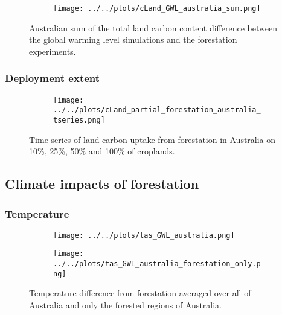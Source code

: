 \documentclass[]{article}
\begin{document}
\begin{figure}[H]
    \centering
    \begin{subfigure}[b]{\linewidth}
        \texttt{[image: ../../plots/cLand\_GWL\_australia\_sum.png]}
    \end{subfigure}
    \caption{Australian sum of the total land carbon content difference between the global warming level simulations and the forestation experiments.}
    \label{fig:australia_cLand}
\end{figure}

\subsubsection{Deployment extent}

\begin{figure}[H]
    \centering
    \begin{subfigure}[b]{\linewidth}
        \texttt{[image: ../../plots/cLand\_partial\_forestation\_australia\_tseries.png]}
    \end{subfigure}
    \caption{Time series of land carbon uptake from forestation in Australia on 10\%, 25\%, 50\% and 100\% of croplands.}
    \label{fig:australia_cLand_tseries}
\end{figure}

\subsection{Climate impacts of forestation}

\subsubsection{Temperature}

\begin{figure}[H]
    \centering
    \begin{subfigure}[b]{0.4\linewidth}
        \texttt{[image: ../../plots/tas\_GWL\_australia.png]}
    \end{subfigure}
    \begin{subfigure}[b]{0.4\linewidth}
        \texttt{[image: ../../plots/tas\_GWL\_australia\_forestation\_only.png]}
    \end{subfigure}
    \caption{Temperature difference from forestation averaged over all of Australia and only the forested regions of Australia.}
    \label{fig:tas_australia_timeseries}
\end{figure}
\end{document}
